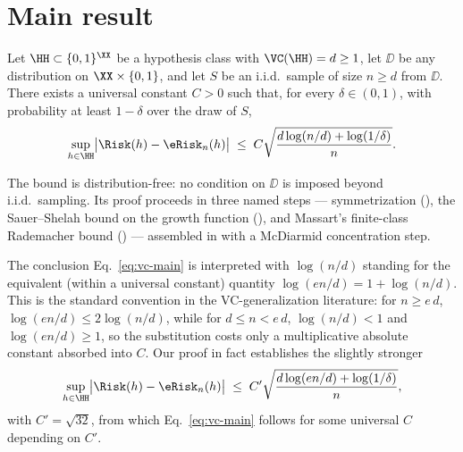\section{Main result}\label{sec:main}

\begin{theorem}\label{thm:vc-generalization}
Let $\HH \subset \{0,1\}^{\XX}$ be a hypothesis class with $\VC(\HH) = d \ge 1$, let $\DD$ be any distribution on $\XX \times \{0,1\}$, and let $S$ be an i.i.d.\ sample of size $n \ge d$ from $\DD$. There exists a universal constant $C > 0$ such that, for every $\delta \in (0, 1)$, with probability at least $1 - \delta$ over the draw of $S$,
\begin{align}\label{eq:vc-main}
\sup_{h \in \HH} \bigl| \Risk(h) - \eRisk_n(h) \bigr|
\;\le\;
C \sqrt{\frac{d \log(n/d) + \log(1/\delta)}{n}}.
\end{align}
\end{theorem}

\begin{remark}\label{rem:scope}
The bound is distribution-free: no condition on $\DD$ is imposed beyond i.i.d.\ sampling. Its proof proceeds in three named steps — symmetrization (), the Sauer--Shelah bound on the growth function (), and Massart's finite-class Rademacher bound () — assembled in  with a McDiarmid concentration step.
\end{remark}

\begin{remark}\label{rem:headline-form}
The conclusion Eq.~\eqref{eq:vc-main} is interpreted with $\log(n/d)$ standing for the equivalent (within a universal constant) quantity $\log(en/d) = 1 + \log(n/d)$. This is the standard convention in the VC-generalization literature: for $n \ge e\, d$, $\log(en/d) \le 2 \log(n/d)$, while for $d \le n < e\, d$, $\log(n/d) < 1$ and $\log(en/d) \ge 1$, so the substitution costs only a multiplicative absolute constant absorbed into $C$. Our proof in fact establishes the slightly stronger
\begin{align*}
\sup_{h \in \HH} \bigl| \Risk(h) - \eRisk_n(h) \bigr|
\;\le\;
C' \sqrt{\frac{d \log(en/d) + \log(1/\delta)}{n}},
\end{align*}
with $C' = \sqrt{32}$, from which Eq.~\eqref{eq:vc-main} follows for some universal $C$ depending on $C'$.
\end{remark}

